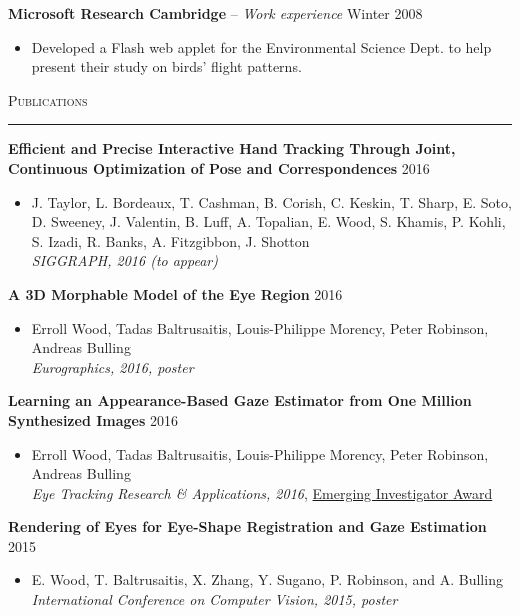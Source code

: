 \documentclass{article}
\begin{document}
\textbf{Microsoft Research Cambridge} -- \emph{Work experience} \hfill Winter 2008 \\[-6mm]
\begin{itemize}
  \item[] Developed a Flash web applet for the Environmental Science Dept. to help present their study on birds' flight patterns.
\end{itemize} \bigskip

\textsc{Publications} \smallskip \hrule \smallskip

\textbf{Efficient and Precise Interactive Hand Tracking Through Joint, Continuous Optimization of Pose and Correspondences} \hfill 2016 \\[-6mm]
\begin{itemize}
  \item[] J. Taylor, L. Bordeaux, T. Cashman, B. Corish, C. Keskin, T. Sharp, E. Soto, D. Sweeney, J. Valentin, B. Luff, A. Topalian, E. Wood, S. Khamis, P. Kohli, S. Izadi, R. Banks, A. Fitzgibbon, J. Shotton \\
  \emph{SIGGRAPH, 2016 (to appear)}
\end{itemize} \smallskip

\textbf{A 3D Morphable Model of the Eye Region} \hfill 2016 \\[-6mm]
\begin{itemize}
  \item[] Erroll Wood, Tadas Baltrusaitis, Louis-Philippe Morency, Peter Robinson, Andreas Bulling \\
  \emph{Eurographics, 2016, poster}
\end{itemize} \smallskip

\textbf{Learning an Appearance-Based Gaze Estimator from One Million Synthesized Images} \hfill 2016 \\[-6mm]
\begin{itemize}
  \item[] Erroll Wood, Tadas Baltrusaitis, Louis-Philippe Morency, Peter Robinson, Andreas Bulling \\
  \emph{Eye Tracking Research \& Applications, 2016}, \underline{Emerging Investigator Award}
\end{itemize} \smallskip

\textbf{Rendering of Eyes for Eye-Shape Registration and Gaze Estimation} \hfill 2015 \\[-6mm]
\begin{itemize}
  \item[] E. Wood, T. Baltrusaitis, X. Zhang, Y. Sugano, P. Robinson, and A. Bulling \\
  \emph{International Conference on Computer Vision, 2015, poster}
\end{itemize} \smallskip
\end{document}
